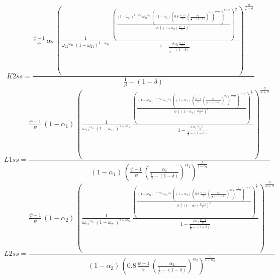 \begin{dmath*}
K2ss = \frac{\frac{{{\psi}}-1}{{{\psi}}}\, {{\alpha_{2}}}\, \left(\frac{1}{{{\omega_{21}}}^{{{\omega_{21}}}}\, \left(1-{{\omega_{21}}}\right)^{1-{{\omega_{21}}}}}\, \frac{\left(\frac{\left(1-{{\omega_{21}}}\right)^{1-{{\omega_{21}}}}\, {{\omega_{21}}}^{{{\omega_{21}}}}\, \left(\left(1-{{\alpha_{2}}}\right)\, \left(0.8\, \frac{{{\psi}}-1}{{{\psi}}}\, \left(\frac{{{\alpha_{2}}}}{\frac{1}{{{\beta}}}-\left(1-{{\delta}}\right)}\right)^{{{\alpha_{2}}}}\right)^{\frac{1}{1-{{\alpha_{2}}}}}\right)^{1+{{\varphi}}}}{{{\phi}}\, \left(\left(1-{{\alpha_{2}}}\right)\, \frac{{{\psi}}-1}{{{\psi}}}\right)^{{{\varphi}}}}\right)^{\frac{1}{{{\sigma}}}}}{1-\frac{{{\delta}}\, {{\alpha_{2}}}\, \frac{{{\psi}}-1}{{{\psi}}}}{\frac{1}{{{\beta}}}-\left(1-{{\delta}}\right)}}\right)^{\frac{{{\sigma}}}{{{\varphi}}+{{\sigma}}}}}{\frac{1}{{{\beta}}}-\left(1-{{\delta}}\right)}
\end{dmath*}
\begin{dmath*}
L1ss = \frac{\frac{{{\psi}}-1}{{{\psi}}}\, \left(1-{{\alpha_{1}}}\right)\, \left(\frac{1}{{{\omega_{11}}}^{{{\omega_{11}}}}\, \left(1-{{\omega_{11}}}\right)^{1-{{\omega_{11}}}}}\, \frac{\left(\frac{\left(1-{{\omega_{11}}}\right)^{1-{{\omega_{11}}}}\, {{\omega_{11}}}^{{{\omega_{11}}}}\, \left(\left(1-{{\alpha_{1}}}\right)\, \left(\frac{{{\psi}}-1}{{{\psi}}}\, \left(\frac{{{\alpha_{1}}}}{\frac{1}{{{\beta}}}-\left(1-{{\delta}}\right)}\right)^{{{\alpha_{1}}}}\right)^{\frac{1}{1-{{\alpha_{1}}}}}\right)^{1+{{\varphi}}}}{{{\phi}}\, \left(\left(1-{{\alpha_{1}}}\right)\, \frac{{{\psi}}-1}{{{\psi}}}\right)^{{{\varphi}}}}\right)^{\frac{1}{{{\sigma}}}}}{1-\frac{{{\delta}}\, {{\alpha_{1}}}\, \frac{{{\psi}}-1}{{{\psi}}}}{\frac{1}{{{\beta}}}-\left(1-{{\delta}}\right)}}\right)^{\frac{{{\sigma}}}{{{\varphi}}+{{\sigma}}}}}{\left(1-{{\alpha_{1}}}\right)\, \left(\frac{{{\psi}}-1}{{{\psi}}}\, \left(\frac{{{\alpha_{1}}}}{\frac{1}{{{\beta}}}-\left(1-{{\delta}}\right)}\right)^{{{\alpha_{1}}}}\right)^{\frac{1}{1-{{\alpha_{1}}}}}}
\end{dmath*}
\begin{dmath*}
L2ss = \frac{\frac{{{\psi}}-1}{{{\psi}}}\, \left(1-{{\alpha_{2}}}\right)\, \left(\frac{1}{{{\omega_{21}}}^{{{\omega_{21}}}}\, \left(1-{{\omega_{21}}}\right)^{1-{{\omega_{21}}}}}\, \frac{\left(\frac{\left(1-{{\omega_{21}}}\right)^{1-{{\omega_{21}}}}\, {{\omega_{21}}}^{{{\omega_{21}}}}\, \left(\left(1-{{\alpha_{2}}}\right)\, \left(0.8\, \frac{{{\psi}}-1}{{{\psi}}}\, \left(\frac{{{\alpha_{2}}}}{\frac{1}{{{\beta}}}-\left(1-{{\delta}}\right)}\right)^{{{\alpha_{2}}}}\right)^{\frac{1}{1-{{\alpha_{2}}}}}\right)^{1+{{\varphi}}}}{{{\phi}}\, \left(\left(1-{{\alpha_{2}}}\right)\, \frac{{{\psi}}-1}{{{\psi}}}\right)^{{{\varphi}}}}\right)^{\frac{1}{{{\sigma}}}}}{1-\frac{{{\delta}}\, {{\alpha_{2}}}\, \frac{{{\psi}}-1}{{{\psi}}}}{\frac{1}{{{\beta}}}-\left(1-{{\delta}}\right)}}\right)^{\frac{{{\sigma}}}{{{\varphi}}+{{\sigma}}}}}{\left(1-{{\alpha_{2}}}\right)\, \left(0.8\, \frac{{{\psi}}-1}{{{\psi}}}\, \left(\frac{{{\alpha_{2}}}}{\frac{1}{{{\beta}}}-\left(1-{{\delta}}\right)}\right)^{{{\alpha_{2}}}}\right)^{\frac{1}{1-{{\alpha_{2}}}}}}
\end{dmath*}
